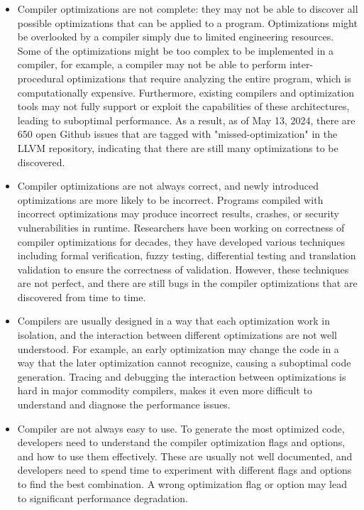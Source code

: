 \begin{itemize}

    \item Compiler optimizations are not complete: they may not be
able to discover all possible optimizations that can be applied to a
program.
%
Optimizations might be overlooked by a compiler simply due to limited
engineering resources.
%
Some of the optimizations might be too complex to be implemented in a
compiler, for example, a compiler may not be able to perform
inter-procedural optimizations that require analyzing the entire
program, which is computationally expensive.
%
Furthermore, existing compilers and optimization tools may not fully
support or exploit the capabilities of these architectures, leading to
suboptimal performance.
%
As a result, as of May 13, 2024, there are 650 open Github issues
that are tagged with "missed-optimization" in the LLVM repository,
indicating that there are still many optimizations to be discovered.


\item Compiler optimizations are not always correct, and newly
introduced optimizations are more likely to be incorrect. Programs
compiled with incorrect optimizations may produce incorrect results,
crashes, or security vulnerabilities in runtime.
%
Researchers have been working on correctness of
compiler optimizations for decades, they have developed various
techniques including formal verification, fuzzy testing, differential
testing and translation validation to ensure the correctness of
validation.
%
However, these techniques are not perfect, and there are
still bugs in the compiler optimizations that are discovered from time
to time.


\item Compilers are usually designed in a way that each optimization
work in isolation, and the interaction between different optimizations
are not well understood.
%
For example, an early optimization may change the code in a way that
the later optimization cannot recognize, causing a suboptimal code
generation.
%
Tracing and debugging the interaction between optimizations is hard in
major commodity compilers, makes it even more difficult to understand
and diagnose the performance issues.

\item Compiler are not always easy to use. To generate the most
optimized code, developers need to understand the compiler
optimization flags and options, and how to use them effectively.
%
These are usually not well documented, and developers need to spend
time to experiment with different flags and options to find the best
combination.
%
A wrong optimization flag or option may lead to significant
performance degradation.

\end{itemize}

